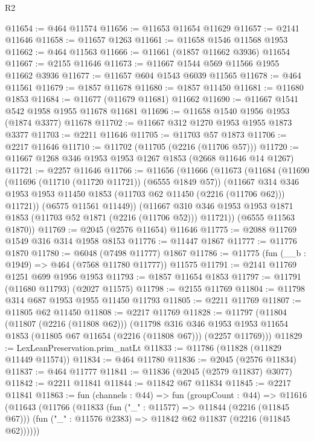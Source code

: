 \begin{lexlean}{R2}
\begin{coremodule}
@11654 := @464 @11574
@11656 := @11653 @11654 @11629
@11657 := @2141 @11646
@11658 := @11657 @1263
@11661 := @11658 @1546 @11568 @1953
@11662 := @464 @11563
@11666 := @11661 (@1857 @11662 @3936) @11654
@11667 := @2155 @11646
@11673 := @11667 @1544 @569 @11566 @1955 @11662 @3936
@11677 := @11657 @604 @1543 @6039 @11565
@11678 := @464 @11561
@11679 := @1857 @11678
@11680 := @1857 @11450
@11681 := @11680 @1853
@11684 := @11677 (@11679 @11681) @11662
@11690 := @11667 @1541 @542 @1958 @1955 @11678 @11681
@11696 := @11658 @1540 @1956 @1953 (@1874 @3377) @11678
@11702 := @11667 @312 @1270 @1953 @1955 @1873 @3377
@11703 := @2211 @11646
@11705 := @11703 @57 @1873
@11706 := @2217 @11646
@11710 := @11702 (@11705 (@2216 (@11706 @57)))
@11720 := @11667 @1268 @346 @1953 @1953 @1267 @1853 (@2668 @11646 @14 @1267)
@11721 := @2257 @11646
@11766 := @11656
    (@11666
      (@11673
        (@11684
          (@11690
            (@11696 (@11710 (@11720 @11721)) (@6555 @1849 @57))
            (@11667
              @314
              @346
              @1953
              @1953
              @11450
              @1853
              (@11703 @62 @11450 (@2216 (@11706 @62)))
              @11721))
          (@6575 @11561 @11449))
        (@11667 @310 @346 @1953 @1953 @1871 @1853 (@11703 @52 @1871 (@2216 (@11706 @52))) @11721))
      (@6555 @11563 @1870))
@11769 := @2045 (@2576 @11654) @11646
@11775 := @2088 @11769 @1549 @316 @314 @1958 @8153
@11776 := @11447 @1867
@11777 := @11776 @1870
@11780 := @6048 (@7498 @11777) @1867
@11786 := @11775 (fun (__b : @1949) => @464 (@7568 @11780 @11777)) @11575
@11791 := @2141 @11769 @1251 @699 @1956 @1953
@11793 := @1857 @11654 @1853
@11797 := @11791 (@11680 @11793) (@2027 @11575)
@11798 := @2155 @11769
@11804 := @11798 @314 @687 @1953 @1955 @11450 @11793
@11805 := @2211 @11769
@11807 := @11805 @62 @11450
@11808 := @2217 @11769
@11828 := @11797
    (@11804
      (@11807 (@2216 (@11808 @62)))
      (@11798
        @316
        @346
        @1953
        @1953
        @11654
        @1853
        (@11805 @67 @11654 (@2216 (@11808 @67)))
        (@2257 @11769)))
@11829 := LexLeanPreservation.prim_natLt
@11833 := @11786 (@11828 (@11829 @11449 @11574))
@11834 := @464 @11780
@11836 := @2045 (@2576 @11834)
@11837 := @464 @11777
@11841 := @11836 (@2045 (@2579 @11837) @3077)
@11842 := @2211 @11841
@11844 := @11842 @67 @11834
@11845 := @2217 @11841
@11863 := fun (channels : @44) =>
  fun (groupCount : @44) =>
  @11616
    (@11643
      (@11766
        (@11833
          (fun ("_" : @11577) => @11844 (@2216 (@11845 @67)))
          (fun ("_" : @11576 @2383) => @11842 @62 @11837 (@2216 (@11845 @62))))))

\end{coremodule}
\end{lexlean}
